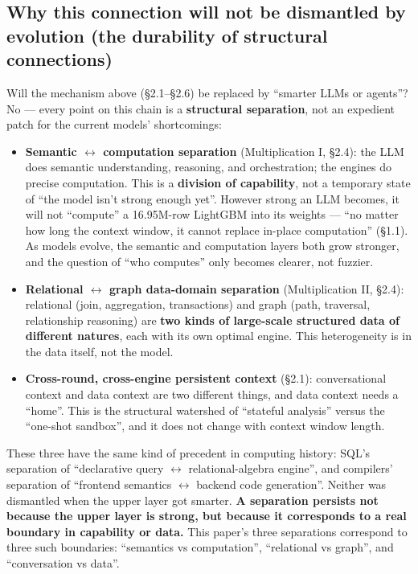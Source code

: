 \documentclass[11pt]{article}
\begin{document}
\subsection{Why this connection will not be dismantled by evolution (the durability of structural connections)}

Will the mechanism above (\S{}2.1--\S{}2.6) be replaced by ``smarter LLMs or agents''? No --- every point on this chain is a \textbf{structural separation}, not an expedient patch for the current models' shortcomings:

\begin{itemize}
\item
  \textbf{Semantic $\leftrightarrow$ computation separation} (Multiplication I, \S{}2.4): the LLM does semantic understanding, reasoning, and orchestration; the engines do precise computation. This is a \textbf{division of capability}, not a temporary state of ``the model isn't strong enough yet''. However strong an LLM becomes, it will not ``compute'' a 16.95M-row LightGBM into its weights --- ``no matter how long the context window, it cannot replace in-place computation'' (\S{}1.1). As models evolve, the semantic and computation layers both grow stronger, and the question of ``who computes'' only becomes clearer, not fuzzier.
\item
  \textbf{Relational $\leftrightarrow$ graph data-domain separation} (Multiplication II, \S{}2.4): relational (join, aggregation, transactions) and graph (path, traversal, relationship reasoning) are \textbf{two kinds of large-scale structured data of different natures}, each with its own optimal engine. This heterogeneity is in the data itself, not the model.
\item
  \textbf{Cross-round, cross-engine persistent context} (\S{}2.1): conversational context and data context are two different things, and data context needs a ``home''. This is the structural watershed of ``stateful analysis'' versus the ``one-shot sandbox'', and it does not change with context window length.
\end{itemize}

These three have the same kind of precedent in computing history: SQL's separation of ``declarative query $\leftrightarrow$ relational-algebra engine'', and compilers' separation of ``frontend semantics $\leftrightarrow$ backend code generation''. Neither was dismantled when the upper layer got smarter. \textbf{A separation persists not because the upper layer is strong, but because it corresponds to a real boundary in capability or data.} This paper's three separations correspond to three such boundaries: ``semantics vs computation'', ``relational vs graph'', and ``conversation vs data''.
\end{document}
